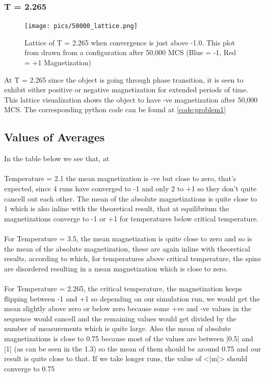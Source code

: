 \documentclass[a4paper,11pt]{article}
\begin{document}
\subsubsection{T = 2.265}
\begin{figure}[!htb]
	\centering
    \texttt{[image: pics/50000\_lattice.png]}
    \caption{Lattice of T = 2.265 when convergence is just above -1.0. This plot from drawn from a configuration after 50,000 MCS (Blue = -1, Red = +1 Magnetization)}
	\label{fig:lat5k}
\end{figure}
At T = 2.265 since the object is going through phase transition, it is seen to exhibit either positive or negative magnetization for extended periods of time. This lattice visualization shows the object to have -ve magnetization after 50,000 MCS.
The corresponding python code can be found at \ref{code:problem1}
\clearpage
\subsection{Values of Averages}\label{prob2}
In the table below we see that, at \\ \\
Temperature = 2.1 the mean magnetization is -ve but close to zero, that's expected, since 4 runs have converged to -1 and only 2 to +1 so they don't quite cancell out each other. The mean of the absolute magnetizations is quite close to 1 which is also inline with the theoretical result, that at equilibrium the magnetizations converge to -1 or +1 for temperatures below critical temperature.\\ \\
For Temperature = 3.5, the mean magnetization is quite close to zero and so is the mean of the absolute magnetization, these are again inline with theoretical results, according to which, for temperatures above critical temperature, the spins are disordered resulting in a mean magnetization which is close to zero.\\ \\
For Temperature = 2.265, the critical temperature, the magnetization keeps flipping between -1 and +1 so depending on our simulation run, we would get the mean slightly above zero or below zero because some +ve and -ve values in the sequence would cancell and the remaining values would get divided by the number of measurements which is quite large. Also the mean of absolute magnetizations is close to 0.75 because most of the values are between |0.5| and |1| (as can be seen in the 1.3) so the mean of them should be around 0.75 and our result is quite close to that. If we take longer runs, the value of <|m|> should converge to 0.75   
\end{document}

